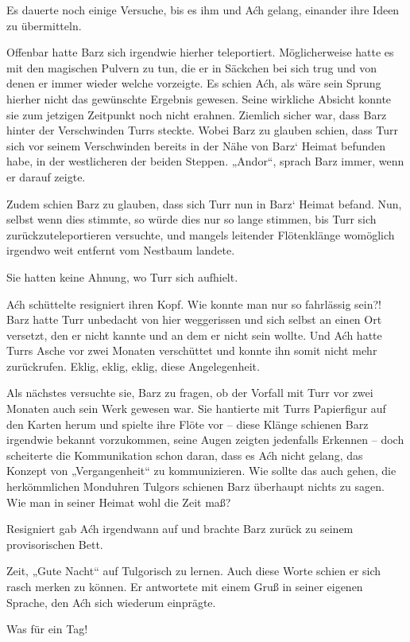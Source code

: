 Es dauerte noch einige Versuche, bis es ihm und Aćh gelang, einander ihre Ideen zu übermitteln.

Offenbar hatte Barz sich irgendwie hierher teleportiert. Möglicherweise hatte es mit den magischen Pulvern zu tun, die er in Säckchen bei sich trug und von denen er immer wieder welche vorzeigte. Es schien Aćh, als wäre sein Sprung hierher nicht das gewünschte Ergebnis gewesen. Seine wirkliche Absicht konnte sie zum jetzigen Zeitpunkt noch nicht erahnen. Ziemlich sicher war, dass Barz hinter der Verschwinden Turrs steckte. Wobei Barz zu glauben schien, dass Turr sich vor seinem Verschwinden bereits in der Nähe von Barz‘ Heimat befunden habe, in der westlicheren der beiden Steppen. „Andor“, sprach Barz immer, wenn er darauf zeigte.

Zudem schien Barz zu glauben, dass sich Turr nun in Barz‘ Heimat befand. Nun, selbst wenn dies stimmte, so würde dies nur so lange stimmen, bis Turr sich zurückzuteleportieren versuchte, und mangels leitender Flötenklänge womöglich irgendwo weit entfernt vom Nestbaum landete.

Sie hatten keine Ahnung, wo Turr sich aufhielt.

Aćh schüttelte resigniert ihren Kopf. Wie konnte man nur so fahrlässig sein?! Barz hatte Turr unbedacht von hier weggerissen und sich selbst an einen Ort versetzt, den er nicht kannte und an dem er nicht sein wollte. Und Aćh hatte Turrs Asche vor zwei Monaten verschüttet und konnte ihn somit nicht mehr zurückrufen. Eklig, eklig, eklig, diese Angelegenheit.

Als nächstes versuchte sie, Barz zu fragen, ob der Vorfall mit Turr vor zwei Monaten auch sein Werk gewesen war. Sie hantierte mit Turrs Papierfigur auf den Karten herum und spielte ihre Flöte vor – diese Klänge schienen Barz irgendwie bekannt vorzukommen, seine Augen zeigten jedenfalls Erkennen – doch scheiterte die Kommunikation schon daran, dass es Aćh nicht gelang, das Konzept von „Vergangenheit“ zu kommunizieren. Wie sollte das auch gehen, die herkömmlichen Monduhren Tulgors schienen Barz überhaupt nichts zu sagen. Wie man in seiner Heimat wohl die Zeit maß?

Resigniert gab Aćh irgendwann auf und brachte Barz zurück zu seinem provisorischen Bett.

Zeit, „Gute Nacht“ auf Tulgorisch zu lernen. Auch diese Worte schien er sich rasch merken zu können. Er antwortete mit einem Gruß in seiner eigenen Sprache, den Aćh sich wiederum einprägte.

Was für ein Tag!



